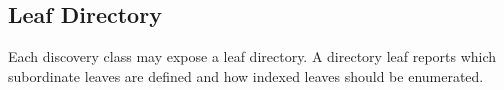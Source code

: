 \subsection{Leaf Directory}
Each discovery class may expose a leaf directory. A directory leaf reports which subordinate leaves are defined and
how indexed leaves should be enumerated.


